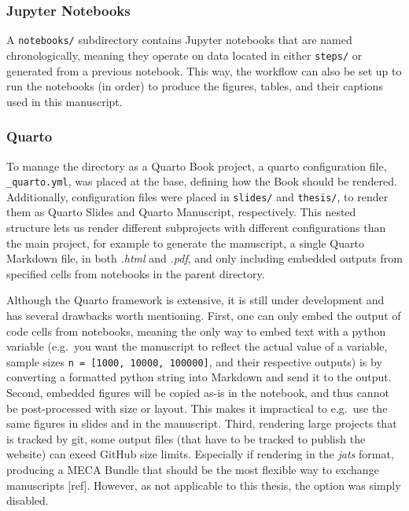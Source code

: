 \documentclass[
  11pt,
  a4paper,
]{scrbook}
\let\oldemph\emph
\renewcommand\emph[1]{\oldemph{\color{gray}#1}}
\begin{document}
\subsubsection{Jupyter Notebooks}\label{jupyter-notebooks}

A \texttt{notebooks/} subdirectory contains Jupyter notebooks that are
named chronologically, meaning they operate on data located in either
\texttt{steps/} or generated from a previous notebook. This way, the
workflow can also be set up to run the notebooks (in order) to produce
the figures, tables, and their captions used in this manuscript.

\subsubsection{Quarto}\label{quarto}

To manage the directory as a Quarto Book project, a quarto configuration
file, \texttt{\_quarto.yml}, was placed at the base, defining how the
Book should be rendered. Additionally, configuration files were placed
in \texttt{slides/} and \texttt{thesis/}, to render them as Quarto
Slides and Quarto Manuscript, respectively. This nested structure lets
us render different subprojects with different configurations than the
main project, for example to generate the manuscript, a single Quarto
Markdown file, in both \emph{.html} and \emph{.pdf}, and only including
embedded outputs from specified cells from notebooks in the parent
directory.

Although the Quarto framework is extensive, it is still under
development and has several drawbacks worth mentioning. First, one can
only embed the output of code cells from notebooks, meaning the only way
to embed text with a python variable (e.g.~you want the manuscript to
reflect the actual value of a variable, sample sizes
\texttt{n\ =\ {[}1000,\ 10000,\ 100000{]}}, and their respective
outputs) is by converting a formatted python string into Markdown and
send it to the output. Second, embedded figures will be copied as-is in
the notebook, and thus cannot be post-processed with size or layout.
This makes it impractical to e.g.~use the same figures in slides and in
the manuscript. Third, rendering large projects that is tracked by git,
some output files (that have to be tracked to publish the website) can
exeed GitHub size limits. Especially if rendering in the \emph{jats}
format, producing a MECA Bundle that should be the most flexible way to
exchange manuscripts {[}ref{]}. However, as not applicable to this
thesis, the option was simply disabled.
\end{document}
